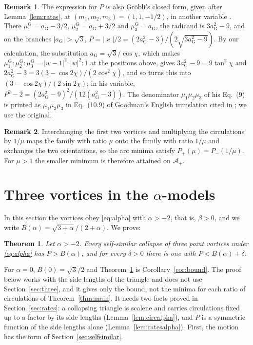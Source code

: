 \documentclass[11pt]{article}
\newtheorem{theorem}{Theorem}
\theoremstyle{definition}
\newtheorem{remark}{Remark}
\newcommand{\Ap}{\mathcal{A}_+}
\begin{document}
\begin{remark}
The expression for $P$ is also Gr\"obli's closed form, given after Lemma~\ref{lem:rates}, at $(m_1, m_2, m_3) = (1, 1, -1/2)$, in another variable \cite[\S~10, pp.~55--59]{grobli1877}. There $\mu^{\mathrm G}_1 = a_{\mathrm G} - 3/2$, $\mu^{\mathrm G}_2 = a_{\mathrm G} + 3/2$ and $\mu^{\mathrm G}_3 = a_{\mathrm G}$, the radicand is $3a_{\mathrm G}^2 - 9$, and on the branches $|a_{\mathrm G}| > \sqrt{3}$, $P = |\varkappa|/2 = (2a_{\mathrm G}^2 - 3)/(2\sqrt{3a_{\mathrm G}^2 - 9})$. By our calculation, the substitution $a_{\mathrm G} = \sqrt{3}/\cos\chi$, which makes $\mu^{\mathrm G}_1 : \mu^{\mathrm G}_2 : \mu^{\mathrm G}_3 = |w - 1|^2 : |w|^2 : 1$ at the positions above, gives $3a_{\mathrm G}^2 - 9 = 9\tan^2\chi$ and $2a_{\mathrm G}^2 - 3 = 3(3 - \cos 2\chi)/(2\cos^2\chi)$, and so turns this into $(3 - \cos 2\chi)/(2\sin 2\chi)$; in his variable, $P^2 - 2 = (2a_{\mathrm G}^2 - 9)^2/(12(a_{\mathrm G}^2 - 3))$. The denominator $\mu_1\mu_2\mu_3$ of his Eq.~(9) is printed as $\mu_1\mu_3\mu_3$ in Eq.~(10.9) of Goodman's English translation cited in \cite{grobli1877}; we use the original.
\end{remark}

\begin{remark}\label{rem:swap}
Interchanging the first two vortices and multiplying the circulations by $1/\mu$ maps the family with ratio $\mu$ onto the family with ratio $1/\mu$ and exchanges the two orientations, so the arc minima satisfy $P_+(\mu) = P_-(1/\mu)$. For $\mu > 1$ the smaller minimum is therefore attained on $\Ap$.
\end{remark}

\section{Three vortices in the \texorpdfstring{$\alpha$}{alpha}-models}\label{sec:alpha}

In this section the vortices obey \eqref{eq:alpha} with $\alpha > -2$, that is, $\beta > 0$, and we write $B(\alpha) = \sqrt{3 + \alpha}/(2 + \alpha)$. We prove:

\begin{theorem}\label{thm:alpha}
Let $\alpha > -2$. Every self-similar collapse of three point vortices under \eqref{eq:alpha} has $P > B(\alpha)$, and for every $\delta > 0$ there is one with $P < B(\alpha) + \delta$.
\end{theorem}

For $\alpha = 0$, $B(0) = \sqrt{3}/2$ and Theorem~\ref{thm:alpha} is Corollary~\ref{cor:bound}. The proof below works with the side lengths of the triangle and does not use Section~\ref{sec:three}, and it gives only the bound, not the minima for each ratio of circulations of Theorem~\ref{thm:main}. It needs two facts proved in Section~\ref{sec:rates}: a collapsing triangle is scalene and carries circulations fixed up to a factor by its side lengths (Lemma~\ref{lem:circalpha}), and $P$ is a symmetric function of the side lengths alone (Lemma~\ref{lem:ratesalpha}). First, the motion has the form of Section~\ref{sec:selfsimilar}.
\end{document}
